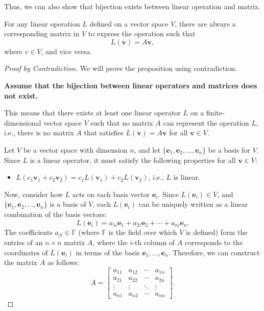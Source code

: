 \documentclass[12pt,a4paper]{article}
\begin{document}
Thus, we can also show that bijection exists between linear operation and matrix.
\begin{proposition}
For any linear operation $L$ defined on a vector space $V$, there are always a corresponding matrix in $V$ to express the operation such that
\[
L(\mathbf{v}) = A \mathbf{v},
\]
where $v\in V$, and vice versa.
\end{proposition}
\begin{proof}[Proof by Contradiction]
We will prove the proposition using contradiction. 

\textbf{Assume that the bijection between linear operators and matrices does not exist. }

This means that there exists at least one linear operator \( L \) on a finite-dimensional vector space \( V \) such that no matrix \( A \) can represent the operation \( L \), i.e., there is no matrix \( A \) that satisfies \( L(\mathbf{v}) = A \mathbf{v} \) for all \( \mathbf{v} \in V \).

Let \( V \) be a vector space with dimension \( n \), and let \( \{ \mathbf{e}_1, \mathbf{e}_2, \dots, \mathbf{e}_n \} \) be a basis for \( V \). Since \( L \) is a linear operator, it must satisfy the following properties for all \( \mathbf{v} \in V \):
\begin{itemize}
    \item \( L(c_1 \mathbf{v}_1 + c_2 \mathbf{v}_2) = c_1 L(\mathbf{v}_1) + c_2 L(\mathbf{v}_2) \), i.e., \( L \) is linear.
\end{itemize}

Now, consider how \( L \) acts on each basis vector \( \mathbf{e}_i \). Since \( L(\mathbf{e}_i) \in V \), and \( \{ \mathbf{e}_1, \mathbf{e}_2, \dots, \mathbf{e}_n \} \) is a basis of \( V \), each \( L(\mathbf{e}_i) \) can be uniquely written as a linear combination of the basis vectors:
\[
L(\mathbf{e}_i) = a_{1i} \mathbf{e}_1 + a_{2i} \mathbf{e}_2 + \cdots + a_{ni} \mathbf{e}_n.
\]
The coefficients \( a_{ji} \in \mathbb{F} \) (where \( \mathbb{F} \) is the field over which \( V \) is defined) form the entries of an \( n \times n \) matrix \( A \), where the \( i \)-th column of \( A \) corresponds to the coordinates of \( L(\mathbf{e}_i) \) in terms of the basis \( \mathbf{e}_1, \dots, \mathbf{e}_n \). Therefore, we can construct the matrix \( A \) as follows:
\[
A = \begin{bmatrix} a_{11} & a_{12} & \cdots & a_{1n} \\ a_{21} & a_{22} & \cdots & a_{2n} \\ \vdots & \vdots & \ddots & \vdots \\ a_{n1} & a_{n2} & \cdots & a_{nn} \end{bmatrix}.
\]


\end{proof}
\end{document}
